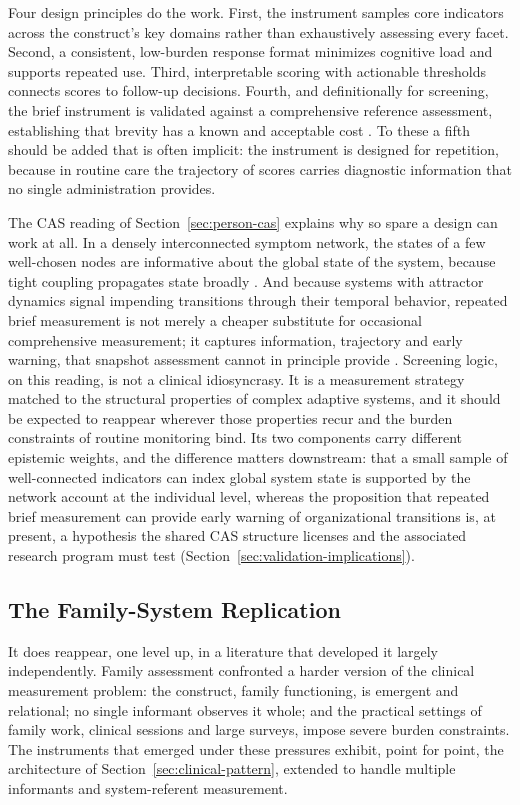 \documentclass[12pt, letterpaper]{article}
\begin{document}
Four design principles do the work. First, the instrument samples core indicators across the construct's key domains rather than exhaustively assessing every facet. Second, a consistent, low-burden response format minimizes cognitive load and supports repeated use. Third, interpretable scoring with actionable thresholds connects scores to follow-up decisions. Fourth, and definitionally for screening, the brief instrument is validated against a comprehensive reference assessment, establishing that brevity has a known and acceptable cost \parencite{kroenke2001}. To these a fifth should be added that is often implicit: the instrument is designed for repetition, because in routine care the trajectory of scores carries diagnostic information that no single administration provides.

The CAS reading of Section~\ref{sec:person-cas} explains why so spare a design can work at all. In a densely interconnected symptom network, the states of a few well-chosen nodes are informative about the global state of the system, because tight coupling propagates state broadly \parencite{borsboom2017}. And because systems with attractor dynamics signal impending transitions through their temporal behavior, repeated brief measurement is not merely a cheaper substitute for occasional comprehensive measurement; it captures information, trajectory and early warning, that snapshot assessment cannot in principle provide \parencite{scheffer2009,vandeLeemput2014}. Screening logic, on this reading, is not a clinical idiosyncrasy. It is a measurement strategy matched to the structural properties of complex adaptive systems, and it should be expected to reappear wherever those properties recur and the burden constraints of routine monitoring bind. Its two components carry different epistemic weights, and the difference matters downstream: that a small sample of well-connected indicators can index global system state is supported by the network account at the individual level, whereas the proposition that repeated brief measurement can provide early warning of organizational transitions is, at present, a hypothesis the shared CAS structure licenses and the associated research program must test (Section~\ref{sec:validation-implications}).

\subsection{The Family-System Replication}
\label{sec:family-replication}

It does reappear, one level up, in a literature that developed it largely independently. Family assessment confronted a harder version of the clinical measurement problem: the construct, family functioning, is emergent and relational; no single informant observes it whole; and the practical settings of family work, clinical sessions and large surveys, impose severe burden constraints. The instruments that emerged under these pressures exhibit, point for point, the architecture of Section~\ref{sec:clinical-pattern}, extended to handle multiple informants and system-referent measurement.
\end{document}
